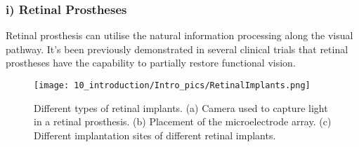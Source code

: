 \subsubsection{i) Retinal Prostheses}
Retinal prosthesis can utilise the natural information processing along the visual pathway. It's been previously demonstrated in several clinical trials that retinal prostheses have the capability to partially restore functional vision. \cite{gaillet2020spatially}

\begin{figure}[H]
\centering
\texttt{[image: 10\_introduction/Intro\_pics/RetinalImplants.png]}
\caption{Different types of retinal implants. (a) Camera used to capture light in a retinal prosthesis. (b) Placement of the microelectrode array. (c) Different implantation sites of different retinal implants.  \cite{zeng2019micro}}
\label{fig:Retinal Implants}
\end{figure}

